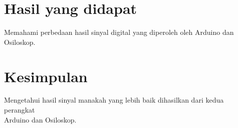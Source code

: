 \section{Hasil yang didapat}
Memahami perbedaan hasil sinyal digital yang diperoleh oleh Arduino dan Osiloskop.

\section{Kesimpulan}
Mengetahui hasil sinyal manakah yang lebih baik dihasilkan dari kedua perangkat \\Arduino dan Osiloskop. 


